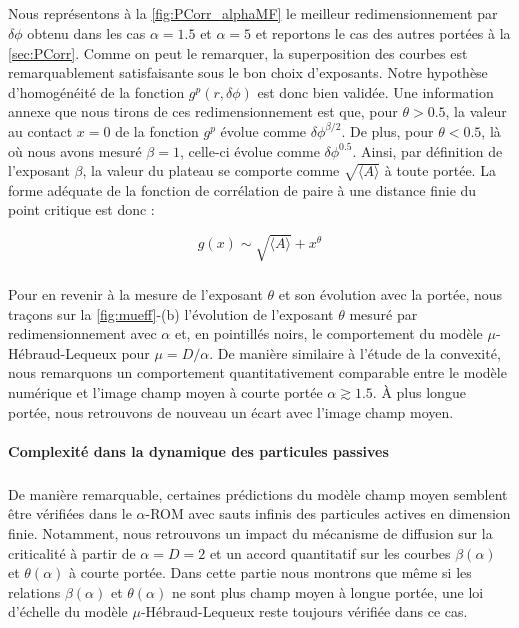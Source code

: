 \subparagraph{}Nous représentons à la \autoref{fig:PCorr_alphaMF} le meilleur redimensionnement par $\delta\phi$ obtenu dans les cas $\alpha = 1.5$ et $\alpha=5$ et reportons le cas des autres portées à la \autoref{sec:PCorr}. Comme on peut le remarquer, la superposition des courbes est remarquablement satisfaisante sous le bon choix d'exposants. Notre hypothèse d'homogénéité de la fonction $g^p(r, \delta\phi)$ est donc bien validée. Une information annexe que nous tirons de ces redimensionnement est que, pour $\theta>0.5$, la valeur au contact $x=0$ de la fonction $g^p$ évolue comme $\delta\phi^{\beta/2}$. De plus, pour $\theta<0.5$, là où nous avons mesuré $\beta=1$, celle-ci évolue comme $\delta\phi^{0.5}$. Ainsi, par définition de l'exposant $\beta$, la valeur du plateau se comporte comme $\sqrt{\langle A \rangle}$ à toute portée. La forme adéquate de la fonction de corrélation de paire à une distance finie du point critique est donc :

\begin{equation}
	g(x) \sim \sqrt{\langle A \rangle} + x^\theta
\end{equation}

\subparagraph{}Pour en revenir à la mesure de l'exposant $\theta$ et son évolution avec la portée, nous traçons sur la \autoref{fig:mueff}-(b) l'évolution de l'exposant $\theta$ mesuré par redimensionnement avec $\alpha$ et, en pointillés noirs, le comportement du modèle $\mu$-Hébraud-Lequeux pour $\mu = D / \alpha$. De manière similaire à l'étude de la convexité, nous remarquons un comportement quantitativement comparable entre le modèle numérique et l'image champ moyen à courte portée $\alpha \gtrsim 1.5$. \`A plus longue portée, nous retrouvons de nouveau un écart avec l'image champ moyen.

\paragraph{Complexité dans la dynamique des particules passives}

\subparagraph{}De manière remarquable, certaines prédictions du modèle champ moyen semblent être vérifiées dans le $\alpha$-ROM avec sauts infinis des particules actives en dimension finie. Notamment, nous retrouvons un impact du mécanisme de diffusion sur la criticalité à partir de $\alpha = D = 2$ et un accord quantitatif sur les courbes $\beta(\alpha)$ et $\theta(\alpha)$ à courte portée. Dans cette partie nous montrons que même si les relations $\beta(\alpha)$ et $\theta(\alpha)$ ne sont plus champ moyen à longue portée, une loi d'échelle du modèle $\mu$-Hébraud-Lequeux reste toujours vérifiée dans ce cas.

